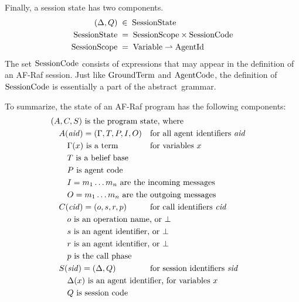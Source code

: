 \documentclass[a4paper,12pt,oneside,fleqn]{book} %
\newcommand{\pmap}{\rightharpoonup}
\begin{document}
Finally, a session state has two components.
\begin{align}
(\Delta,Q) &\;\in\;{\rm SessionState}
\\
{\rm SessionState} &\;=\; {\rm SessionScope}\times{\rm SessionCode}
\\
{\rm SessionScope} &\;=\; {\rm Variable}\pmap{\rm AgentId}
\end{align}
The set ${\rm SessionCode}$ consists of expressions that may appear in the
definition of an AF-Raf session. Just like ${\rm GroundTerm}$ and ${\rm
AgentCode}$, the definition of ${\rm SessionCode}$ is essentially a part of
the abstract~grammar.

To summarize, the state of an AF-Raf program has the following components:
{\def\.#1{\text{\rlap{ #1}}}
\begin{align}
&(A, C, S)\.{is the program state, where} \\
&\quad A({\it aid})=(\Gamma, T, P, I, O)
  &&\text{for all agent identifiers~$\it aid$} \\
&\quad\quad \text{$\Gamma(x)$ is a term} && \text{for variables~$x$} \\
&\quad\quad T\.{is a belief base} \\
&\quad\quad P\.{is agent code} \\
&\quad\quad I=m_1\ldots m_n\.{are the incoming messages} \\
&\quad\quad O=m_1\ldots m_n\.{are the outgoing messages} \\
&\quad C({\it cid})=(o,s,r,p)
  &&\text{for call identifiers~$\it cid$} \\
&\quad\quad o\.{is an operation name, or $\bot$} \\
&\quad\quad s\.{is an agent identifier, or $\bot$} \\
&\quad\quad r\.{is an agent identifier, or $\bot$} \\
&\quad\quad p\.{is the call phase} \\
&\quad S({\it sid})=(\Delta,Q)
  &&\text{for session identifiers~$\it sid$} \\
&\quad\quad \Delta(x)\.{is an agent identifier, for variables~$x$} \\
&\quad\quad Q\.{is session code}
\end{align}}
\end{document}
